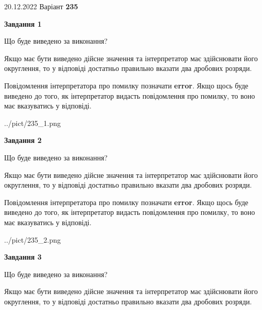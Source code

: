 \documentclass[12pt, ukrainian]{article}
\begin{document}
{20.12.2022 Варіант \No \textbf { 235 }\par}
{
\begin {Large}

{\begin {center}\textbf{Завдання 1}\end {center}}\par
Що буде виведено за виконання? \par

Якщо має бути виведено дійсне значення та інтерпретатор має здійснювати його округлення, 
то у відповіді достатньо правильно вказати два дробових розряди.

Повідомлення інтерпретатора про помилку позначати \textbf{error}.
Якщо щось буде виведено до того, як інтерпретатор видасть повідомлення про помилку, 
то воно має вказуватись у відповіді. \par

\begin{center}
	{../pict/235_1.png}
\end{center}
\newpage

{\begin {center}\textbf{Завдання 2}\end {center}}\par
Що буде виведено за виконання? \par

Якщо має бути виведено дійсне значення та інтерпретатор має здійснювати його округлення, 
то у відповіді достатньо правильно вказати два дробових розряди.

Повідомлення інтерпретатора про помилку позначати \textbf{error}.
Якщо щось буде виведено до того, як інтерпретатор видасть повідомлення про помилку, 
то воно має вказуватись у відповіді. \par

\begin{center}
	{../pict/235_2.png}
\end{center}
\newpage

{\begin {center}\textbf{Завдання 3}\end {center}}\par
Що буде виведено за виконання? \par

Якщо має бути виведено дійсне значення та інтерпретатор має здійснювати його округлення, 
то у відповіді достатньо правильно вказати два дробових розряди.


\end{Large}}
\end{document}
